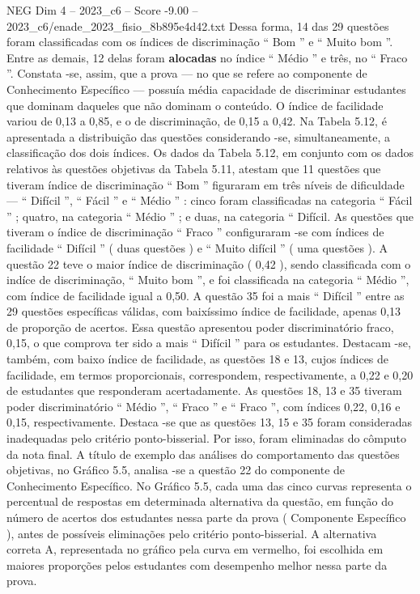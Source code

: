 \begin{textsample}{NEG Dim 4 – 2023\_c6 – Score -9.00 – 2023\_c6/enade\_2023\_fisio\_8b895e4d42.txt}
Dessa forma, 14 das 29 questões foram classificadas com os índices de discriminação “ Bom ” e “ Muito bom ”.
Entre as demais, 12 delas foram \textbf{alocadas} no índice “ Médio ” e três, no “ Fraco ”.
Constata -se, assim, que a prova — no que se refere ao componente de Conhecimento Específico — possuía média capacidade de discriminar estudantes que dominam daqueles que não dominam o conteúdo.
O índice de facilidade variou de 0,13 a 0,85, e o de discriminação, de 0,15 a 0,42.
Na Tabela 5.12, é apresentada a distribuição das questões considerando -se, simultaneamente, a classificação dos dois índices.
Os dados da Tabela 5.12, em conjunto com os dados relativos às questões objetivas da Tabela 5.11, atestam que 11 questões que tiveram índice de discriminação “ Bom ” figuraram em três níveis de dificuldade — “ Difícil ”, “ Fácil ” e “ Médio ” : cinco foram classificadas na categoria “ Fácil ” ; quatro, na categoria “ Médio ” ; e duas, na categoria “ Difícil.
As questões que tiveram o índice de discriminação “ Fraco ” configuraram -se com índices de facilidade “ Difícil ” ( duas questões ) e “ Muito difícil ” ( uma questões ).
A questão 22 teve o maior índice de discriminação ( 0,42 ), sendo classificada com o indíce de discriminação, “ Muito bom ”, e foi classificada na categoria “ Médio ”, com índice de facilidade igual a 0,50.
A questão 35 foi a mais “ Difícil ” entre as 29 questões específicas válidas, com baixíssimo índice de facilidade, apenas 0,13 de proporção de acertos.
Essa questão apresentou poder discriminatório fraco, 0,15, o que comprova ter sido a mais “ Difícil ” para os estudantes.
Destacam -se, também, com baixo índice de facilidade, as questões 18 e 13, cujos índices de facilidade, em termos proporcionais, correspondem, respectivamente, a 0,22 e 0,20 de estudantes que responderam acertadamente.
As questões 18, 13 e 35 tiveram poder discriminatório “ Médio ”, “ Fraco ” e “ Fraco ”, com índices 0,22, 0,16 e 0,15, respectivamente.
Destaca -se que as questões 13, 15 e 35 foram consideradas inadequadas pelo critério ponto-bisserial.
Por isso, foram eliminadas do cômputo da nota final.
A título de exemplo das análises do comportamento das questões objetivas, no Gráfico 5.5, analisa -se a questão 22 do componente de Conhecimento Específico.
No Gráfico 5.5, cada uma das cinco curvas representa o percentual de respostas em determinada alternativa da questão, em função do número de acertos dos estudantes nessa parte da prova ( Componente Específico ), antes de possíveis eliminações pelo critério ponto-bisserial.
A alternativa correta A, representada no gráfico pela curva em vermelho, foi escolhida em maiores proporções pelos estudantes com desempenho melhor nessa parte da prova.

\end{textsample}
